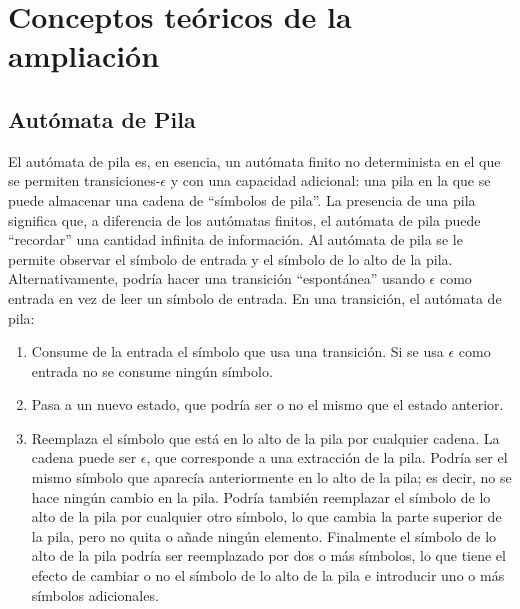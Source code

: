 \documentclass[12pt,a4paper,spanish]{book}
\begin{document}
\section{Conceptos te\'oricos de la ampliaci\'on}
\subsection{Aut\'omata de Pila}
El aut\'omata de pila es, en esencia, un aut\'omata finito no determinista en el que
se permiten transiciones-$\epsilon$ y con una capacidad adicional: una pila en la
que se puede almacenar una cadena de ``s\'imbolos de pila''. La presencia de una
pila significa que, a diferencia de los aut\'omatas finitos, el aut\'omata de pila puede
``recordar'' una cantidad infinita de informaci\'on.
Al aut\'omata de pila se le permite observar el s\'imbolo de entrada y el s\'imbolo de lo
alto de la pila. Alternativamente, podr\'ia hacer una transici\'on ``espont\'anea'' usando
$\epsilon$ como entrada en vez de leer un s\'imbolo de entrada. En una transici\'on, el
aut\'omata de pila:
\begin{enumerate}
\item Consume de la entrada el s\'imbolo que usa una transici\'on. Si se usa $\epsilon$
como entrada no se consume ning\'un s\'imbolo.
\item Pasa a un nuevo estado, que podr\'ia ser o no el mismo que el estado anterior.
\item Reemplaza el s\'imbolo que est\'a en lo alto de la pila por cualquier cadena. La
cadena puede ser $\epsilon$, que corresponde a una extracci\'on de la pila. Podr\'ia
ser el mismo s\'imbolo que aparec\'ia anteriormente en lo alto de la pila; es decir, no
se hace ning\'un cambio en la pila. Podr\'ia tambi\'en reemplazar el s\'imbolo de lo alto
de la pila por cualquier otro s\'imbolo, lo que cambia la parte superior de la pila, pero
no quita o a\~nade ning\'un elemento. Finalmente el s\'imbolo de lo alto de la pila podr\'ia
ser reemplazado por dos o m\'as s\'imbolos, lo que tiene el efecto de cambiar o no el
s\'imbolo de lo alto de la pila e introducir uno o m\'as s\'imbolos adicionales.\\
\end{enumerate}
\newpage
\end{document}

